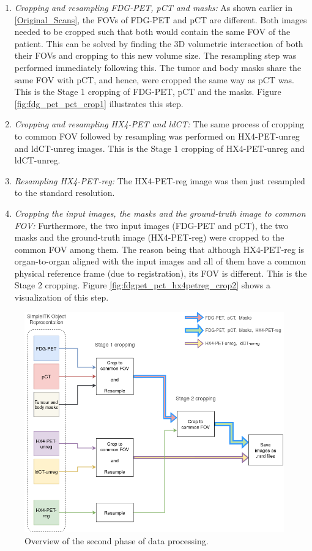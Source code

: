 \begin{enumerate}
    \item \textit{Cropping and resampling FDG-PET, pCT and masks:} As shown earlier in \ref{Original_Scans}, the FOVs of FDG-PET and pCT are different. Both images needed to be cropped such that both would contain the same FOV of the patient. This can be solved by finding the 3D volumetric intersection of both their FOVs and cropping to this new volume size. The resampling step was performed immediately following this. The tumor and body masks share the same FOV with pCT, and hence, were cropped the same way as pCT was. This is the Stage 1 cropping of FDG-PET, pCT and the masks. Figure \ref{fig:fdg_pet_pct_crop1} illustrates this step.

    \item \textit{Cropping and resampling HX4-PET and ldCT:} The same process of cropping to common FOV followed by resampling was performed on HX4-PET-unreg and ldCT-unreg images. This is the Stage 1 cropping of HX4-PET-unreg and ldCT-unreg.

    \item \textit{Resampling HX4-PET-reg:} The HX4-PET-reg image was then just resampled to the standard resolution.

    \item \textit{Cropping the input images, the masks and the ground-truth image to common FOV:} Furthermore, the two input images (FDG-PET and pCT), the two masks and the ground-truth image (HX4-PET-reg) were cropped to the common FOV among them. The reason being that although HX4-PET-reg is organ-to-organ aligned with the input images and all of them have a common physical reference frame (due to registration), its FOV is different. This is the Stage 2 cropping. Figure \ref{fig:fdgpet_pct_hx4petreg_crop2} shows a visualization of this step.
\end{enumerate}

\begin{figure}[h!]
    \centering
    \includegraphics[width=0.8\linewidth]{figures/Data/data_processing_overview-step_2.png}
    \caption{Overview of the second phase of data processing.}
    \label{fig:data_proc_overview_2}
\end{figure}

